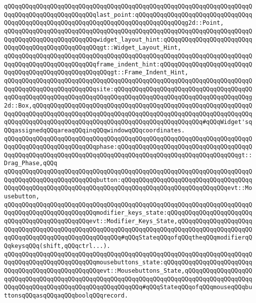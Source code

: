 \verb|qQQqqQQqqQQqqQQqqQQqqQQqqQQqqQQqqQQqqQQqqQQqqQQqqQQqqQQqqQQqqQQqqQQqqQQqqQQqqQQqqQQqqQQqqQQqqQQqlast_point:qQQqqQQqqQQqqQQqqQQqqQQqqQQqqQQqqQQqqQQqqQQqqQQqqQQqqQQqqQQqqQQqqQQqqQQqqQQqqQQqqQQqg2d::Point,|\newline
\verb|qQQqqQQqqQQqqQQqqQQqqQQqqQQqqQQqqQQqqQQqqQQqqQQqqQQqqQQqqQQqqQQqqQQqqQQqqQQqqQQqqQQqqQQqqQQqqQQqwidget_layout_hint:qQQqqQQqqQQqqQQqqQQqqQQqqQQqqQQqqQQqqQQqqQQqqQQqqQQqgt::Widget_Layout_Hint,|\newline
\verb|qQQqqQQqqQQqqQQqqQQqqQQqqQQqqQQqqQQqqQQqqQQqqQQqqQQqqQQqqQQqqQQqqQQqqQQqqQQqqQQqqQQqqQQqqQQqqQQqframe_indent_hint:qQQqqQQqqQQqqQQqqQQqqQQqqQQqqQQqqQQqqQQqqQQqqQQqqQQqqQQqgt::Frame_Indent_Hint,|\newline
\verb|qQQqqQQqqQQqqQQqqQQqqQQqqQQqqQQqqQQqqQQqqQQqqQQqqQQqqQQqqQQqqQQqqQQqqQQqqQQqqQQqqQQqqQQqqQQqqQQqsite:qQQqqQQqqQQqqQQqqQQqqQQqqQQqqQQqqQQqqQQqqQQqqQQqqQQqqQQqqQQqqQQqqQQqqQQqqQQqqQQqqQQqqQQqqQQqqQQqqQQqqQQqqQQqg2d::Box,qQQqqQQqqQQqqQQqqQQqqQQqqQQqqQQqqQQqqQQqqQQqqQQqqQQqqQQqqQQqqQQqqQQqqQQqqQQqqQQqqQQqqQQqqQQqqQQqqQQqqQQqqQQqqQQqqQQqqQQqqQQqqQQqqQQqqQQqqQQqqQQqqQQqqQQqqQQqqQQqqQQqqQQqqQQqqQQqqQQqqQQqqQQq#qQQqWidget'sqQQqassignedqQQqareaqQQqinqQQqwindowqQQqcoordinates.|\newline
\verb|qQQqqQQqqQQqqQQqqQQqqQQqqQQqqQQqqQQqqQQqqQQqqQQqqQQqqQQqqQQqqQQqqQQqqQQqqQQqqQQqqQQqqQQqqQQqqQQqphase:qQQqqQQqqQQqqQQqqQQqqQQqqQQqqQQqqQQqqQQqqQQqqQQqqQQqqQQqqQQqqQQqqQQqqQQqqQQqqQQqqQQqqQQqqQQqqQQqqQQqqQQqgt::Drag_Phase,qQQq|\newline
\verb|qQQqqQQqqQQqqQQqqQQqqQQqqQQqqQQqqQQqqQQqqQQqqQQqqQQqqQQqqQQqqQQqqQQqqQQqqQQqqQQqqQQqqQQqqQQqqQQqbutton:qQQqqQQqqQQqqQQqqQQqqQQqqQQqqQQqqQQqqQQqqQQqqQQqqQQqqQQqqQQqqQQqqQQqqQQqqQQqqQQqqQQqqQQqqQQqqQQqqQQqevt::Mousebutton,|\newline
\verb|qQQqqQQqqQQqqQQqqQQqqQQqqQQqqQQqqQQqqQQqqQQqqQQqqQQqqQQqqQQqqQQqqQQqqQQqqQQqqQQqqQQqqQQqqQQqqQQqmodifier_keys_state:qQQqqQQqqQQqqQQqqQQqqQQqqQQqqQQqqQQqqQQqqQQqqQQqevt::Modifier_Keys_State,qQQqqQQqqQQqqQQqqQQqqQQqqQQqqQQqqQQqqQQqqQQqqQQqqQQqqQQqqQQqqQQqqQQqqQQqqQQqqQQqqQQqqQQqqQQqqQQqqQQqqQQqqQQqqQQqqQQqqQQqqQQq#qQQqStateqQQqofqQQqtheqQQqmodifierqQQqkeysqQQq(shift,qQQqctrl...).|\newline
\verb|qQQqqQQqqQQqqQQqqQQqqQQqqQQqqQQqqQQqqQQqqQQqqQQqqQQqqQQqqQQqqQQqqQQqqQQqqQQqqQQqqQQqqQQqqQQqqQQqmousebuttons_state:qQQqqQQqqQQqqQQqqQQqqQQqqQQqqQQqqQQqqQQqqQQqqQQqqQQqevt::Mousebuttons_State,qQQqqQQqqQQqqQQqqQQqqQQqqQQqqQQqqQQqqQQqqQQqqQQqqQQqqQQqqQQqqQQqqQQqqQQqqQQqqQQqqQQqqQQqqQQqqQQqqQQqqQQqqQQqqQQqqQQqqQQqqQQqqQQq#qQQqStateqQQqofqQQqmouseqQQqbuttonsqQQqasqQQqaqQQqboolqQQqrecord.|\newline
